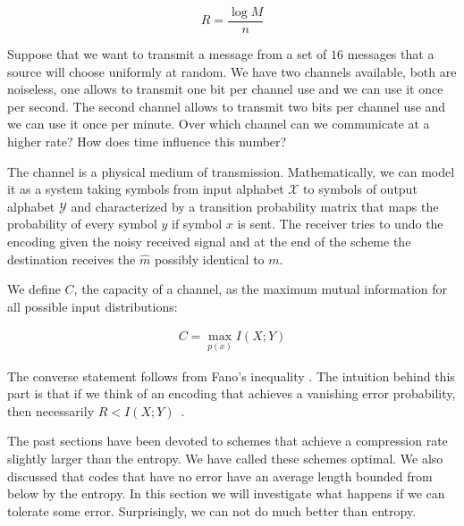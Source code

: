 \begin{equation}
R=\frac{\log M}{n}
\end{equation}

\begin{exercise}
Suppose that we want to transmit a message from a set of $16$ messages that a source will choose uniformly at random. We have two channels available, both are noiseless, one allows to transmit one bit per channel use and we can use it once per second. The second channel allows to transmit two bits per channel use and we can use it once per minute. Over which channel can we communicate at a higher rate? How does time influence this number?
\end{exercise}
The channel is a physical medium of transmission. Mathematically, we can model it as a system taking symbols from input alphabet $\mathcal{X}$ to symbols of output alphabet $\mathcal{Y}$ and characterized by a transition probability matrix that maps the probability of every symbol $y$ if symbol $x$ is sent. The receiver tries to undo the encoding given the noisy received signal and at the end of the scheme the destination receives the ${\hat{m}}$ possibly identical to $m$.

We define $C$, the capacity of a channel, as the maximum mutual information for all possible input distributions: 

\begin{eqnarray}
\label{eq:capform}
C = \max_{p(x)} I(X;Y)
\end{eqnarray}


The converse statement follows from Fano's inequality \cite{Fano_61}. The intuition behind this part is that if we think of an encoding that achieves a vanishing error probability, then necessarily $R<I(X;Y)$~\cite{Cover_91}. 

The past sections have been devoted to schemes that achieve a compression rate slightly larger than the entropy. We have called these schemes optimal. We also discussed that codes that have no error have an average length bounded from below by the entropy. In this section we will investigate what happens if we can tolerate some error. Surprisingly, we can not do much better than entropy. 

